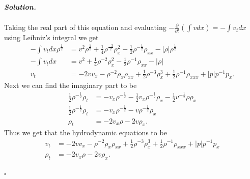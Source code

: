 \documentclass[12pt]{report}
\newenvironment{solution}[1][\it{Solution}]{\textbf{#1. } }{$\square$}
\newcommand{\paren}[1]{{\left(#1\right)}} %
\newcommand{\abs}[1]{{\left|#1\right|}} %
\newcommand{\pp}[2]{\frac{\partial #1}{\partial #2}} %
\begin{document}
\begin{solution}
\begin{enumerate}
\begin{align*}
        \end{align*}
        Taking the real part of this equation and evaluating $-\pp{}{t}\paren{\int v dx} = -\int v_t dx$ using Leibniz's integral we get
        \begin{align*}
            -\int v_t dx \rho^{\frac{1}{2}} &= v^2 \rho^{\frac{1}{2}} + \frac{1}{4}\rho^{\frac{-3}{2}}\rho_x^2 - \frac{1}{2}\rho^{-\frac{1}{2}}\rho_{xx} - \abs{\rho}\rho^{\frac{1}{2}}\\
            -\int v_t dx &= v^2 + \frac{1}{4}\rho^{-2}\rho_x^2 - \frac{1}{2}\rho^{-1}\rho_{xx} - \abs{\rho}\\
            v_t &= -2vv_x - \rho^{-2}\rho_x\rho_{xx} + \frac{1}{2}\rho^{-3}\rho_x^3 + \frac{1}{2}\rho^{-1}\rho_{xxx}+\abs{p}p^{-1}p_x.
        \end{align*}
        Next we can find the imaginary part to be
        \begin{align*}
            \frac{1}{2}\rho^{-\frac{1}{2}}\rho_t &= -v_x\rho^{-\frac{1}{2}} - \frac{1}{2}v_x \rho^{-\frac{1}{2}}\rho_x - \frac{1}{2}v^{-\frac{1}{2}}\rho\rho_x\\
            \frac{1}{2}\rho^{-\frac{1}{2}}\rho_t &= -v_x \rho^{-\frac{1}{2}} - v\rho^{-\frac{1}{2}}\rho_x\\
            \rho_t &= -2v_x\rho - 2v\rho_x.
        \end{align*}
        Thus we get that the hydrodynamic equations to be
        \begin{align*}
            v_t &= -2vv_x - \rho^{-2}\rho_x\rho_{xx} + \frac{1}{2}\rho^{-3}\rho_x^3 + \frac{1}{2}\rho^{-1}\rho_{xxx}+\abs{p}p^{-1}p_x\\
            \rho_t &= -2v_x\rho - 2v\rho_x.
        \end{align*}


\end{enumerate}
\end{solution}
\end{document}
